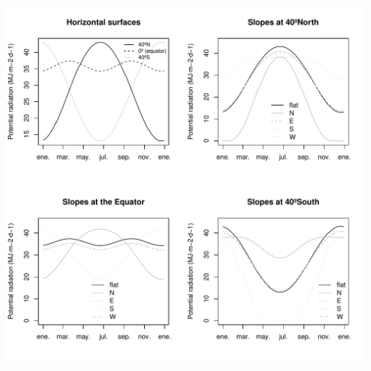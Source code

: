 \documentclass[11pt,a4paper]{article}
\begin{document}
\begin{center}
\includegraphics{Meteorology-024}
\end{center}
\end{document}
